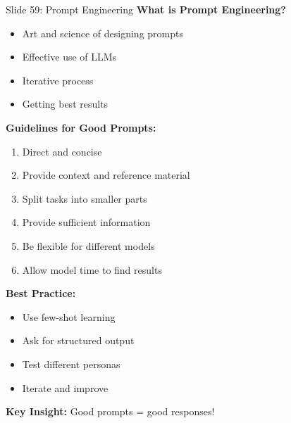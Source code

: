 \documentclass[8pt]{beamer}
\begin{document}
	\begin{frame}{Slide 59: Prompt Engineering}
		\fontsize{6.5}{7.5}\selectfont
		\textbf{What is Prompt Engineering?}
		\begin{itemize}
			\item Art and science of designing prompts
			\item Effective use of LLMs
			\item Iterative process
			\item Getting best results
		\end{itemize}
		
		\vspace{0.1cm}
		\textbf{Guidelines for Good Prompts:}
		\begin{enumerate}
			\item Direct and concise
			\item Provide context and reference material
			\item Split tasks into smaller parts
			\item Provide sufficient information
			\item Be flexible for different models
			\item Allow model time to find results
		\end{enumerate}
		
		\vspace{0.1cm}
		\textbf{Best Practice:}
		\begin{itemize}
			\item Use few-shot learning
			\item Ask for structured output
			\item Test different personas
			\item Iterate and improve
		\end{itemize}
		
		\textcolor{myblue}{\textbf{Key Insight:}} Good prompts = good responses!
	\end{frame}
	
\end{document}
